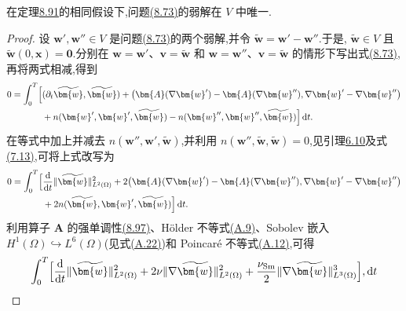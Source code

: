 \begin{theorem}[弱解的唯一性]
\label{thm:smagorinsky-weak-solution-uniqueness}
在定理\hyperref[thm:smagorinsky-weak-solution-existence]{8.91}的相同假设下,问题\hyperref[eq:smagorinsky-weak-form]{(8.73)}的弱解在 $V$ 中唯一.
\begin{proof}
设 $\bm{w}',\bm{w}''\in V$ 是问题\hyperref[eq:smagorinsky-weak-form]{(8.73)}的两个弱解,并令
$\widetilde{\bm{w}}=\bm{w}'-\bm{w}''$.于是,
$\widetilde{\bm{w}}\in V$ 且 $\widetilde{\bm{w}}(0,\bm{x})=\bm{0}$.分别在
$\bm{w}=\bm{w}'$、$\bm{v}=\widetilde{\bm{w}}$ 和
$\bm{w}=\bm{w}''$、$\bm{v}=\widetilde{\bm{w}}$ 的情形下写出式\hyperref[eq:smagorinsky-weak-form]{(8.73)},再将两式相减,得到
\[
\begin{aligned}
0=\int_0^T\Bigl[&
 (\partial_t\widetilde{\bm{w}},\widetilde{\bm{w}})
 +\bigl(\bm{A}(\nabla\bm{w}')
          -\bm{A}(\nabla\bm{w}''),
          \nabla\bm{w}'-\nabla\bm{w}''\bigr)\\
 &+n(\bm{w}',\bm{w}',\widetilde{\bm{w}})
  -n(\bm{w}'',\bm{w}'',\widetilde{\bm{w}})\Bigr]\,\mathrm{d}t.
\end{aligned}
\]
在等式中加上并减去 $n(\bm{w}'',\bm{w}',\widetilde{\bm{w}})$,并利用
$n(\bm{w}'',\widetilde{\bm{w}},\widetilde{\bm{w}})=0$,见引理\hyperref[lem:steady-ns-convection-vanishing]{6.10}及式\hyperref[eq:time-dependent-galerkin-product-rule]{(7.13)},可将上式改写为
\[
\begin{aligned}
0=\int_0^T\Bigl[
 &\frac{\mathrm{d}}{\mathrm{d}t}
       \|\widetilde{\bm{w}}\|_{L^2(\Omega)}^2
 +2\bigl(\bm{A}(\nabla\bm{w}')
          -\bm{A}(\nabla\bm{w}''),
          \nabla\bm{w}'-\nabla\bm{w}''\bigr)\\
 &+2n(\widetilde{\bm{w}},\bm{w}',
                         \widetilde{\bm{w}})\Bigr]\,\mathrm{d}t.
\end{aligned}
\]
利用算子 $\bm{A}$ 的强单调性\hyperref[eq:smagorinsky-turbulent-strong-monotonicity]{(8.97)}、Hölder 不等式\hyperref[eq:appendix-a-9]{(A.9)}、Sobolev 嵌入
$H^1(\Omega)\hookrightarrow L^6(\Omega)$(见式\hyperref[eq:appendix-a-22]{(A.22)})和 Poincaré 不等式\hyperref[eq:appendix-a-12]{(A.12)},可得
\begin{equation}\label{eq:smagorinsky-uniqueness-convection-estimate}
\begin{aligned}
 \int_0^T\Bigl[&
 \frac{\mathrm{d}}{\mathrm{d}t}
       \|\widetilde{\bm{w}}\|_{L^2(\Omega)}^2
 +2\nu\|\nabla\widetilde{\bm{w}}\|_{L^2(\Omega)}^2
 +\frac{\nu_{\mathrm{Sm}}}{2}
       \|\nabla\widetilde{\bm{w}}\|_{L^3(\Omega)}^3\Bigr],\mathrm{d}t\\

\end{aligned}
\end{equation}
\end{proof}
\end{theorem}

